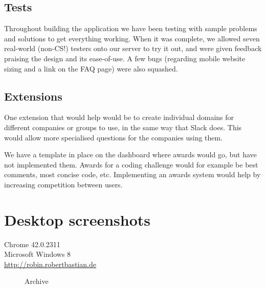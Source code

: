 \documentclass{report}
\begin{document}
\section{Tests}
Throughout building the application we have been testing with sample problems and solutions to get everything working. When it was complete, we allowed seven real-world (non-CS!) testers onto our server to try it out, and were given feedback praising the design and its ease-of-use. A few bugs (regarding mobile website sizing and a link on the FAQ page) were also squashed.

\section{Extensions}
One extension that would help would be to create individual domains for different companies or groups to use, in the same way that Slack does. This would allow more specialised questions for the companies using them.

We have a template in place on the dashboard where awards would go, but have not implemented them. Awards for a coding challenge would for example be best comments, most concise code, etc. Implementing an awards system would help by increasing competition between users.

\appendix

\chapter{Desktop screenshots}
Chrome 42.0.2311\\Microsoft Windows 8\\\url{http://robin.robertbastian.de}

\begin{figure}
\caption{Archive}
\end{figure}
\end{document}
